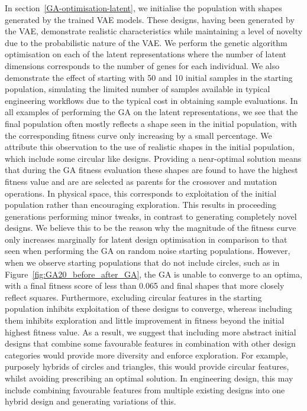 \documentclass{article}
\begin{document}
In section~\ref{GA-optimisation-latent}, we initialise the population with shapes generated by the trained VAE models. These designs, having been generated by the VAE, demonstrate realistic characteristics while maintaining a level of novelty due to the probabilistic nature of the VAE. We perform the genetic algorithm optimisation on each of the latent representations where the number of latent dimensions corresponds to the number of genes for each individual. We also demonstrate the effect of starting with 50 and 10 initial samples in the starting population, simulating the limited number of samples available in typical engineering workflows due to the typical cost in obtaining sample evaluations. In all examples of performing the GA on the latent representations, we see that the final population often mostly reflects a shape seen in the initial population, with the corresponding fitness curve only increasing by a small percentage. We attribute this observation to the use of realistic shapes in the initial population, which include some circular like designs. Providing a near-optimal solution means that during the GA fitness evaluation these shapes are found to have the highest fitness value and are are selected as parents for the crossover and mutation operations. In physical space, this corresponds to exploitation of the initial population rather than encouraging exploration. This results in proceeding generations performing minor tweaks, in contrast to generating completely novel designs. We believe this to be the reason why the magnitude of the fitness curve only increases marginally for latent design optimisation in comparison to that seen when performing the GA on random noise starting populations. However, when we observe starting populations that do not include circles, such as in Figure~\ref{fig:GA20_before_after_GA}, the GA is unable to converge to an optima, with a final fitness score of less than 0.065 and final shapes that more closely reflect squares. Furthermore, excluding circular features in the starting population inhibits exploitation of these designs to converge, whereas including them inhibits exploration and little improvement in fitness beyond the initial highest fitness value. As a result, we suggest that including more abstract initial designs that combine some favourable features in combination with other design categories would provide more diversity and enforce exploration. For example, purposely hybrids of circles and triangles, this would provide circular features, whilst avoiding prescribing an optimal solution. In engineering design, this may include combining favourable features from multiple existing designs into one hybrid design and generating variations of this.
\end{document}
